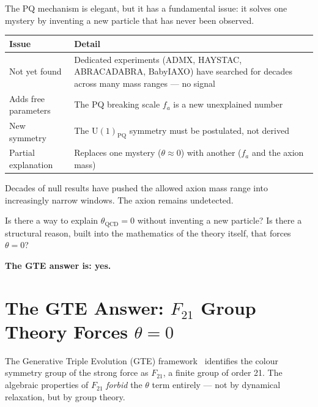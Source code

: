 \documentclass[11pt,a4paper]{article}
\begin{document}
The PQ mechanism is elegant, but it has a fundamental issue: it solves one mystery by inventing a new particle that has never been observed.

\begin{center}
\begin{tabular}{@{}p{3.2cm}p{9cm}@{}}
\toprule
Issue & Detail \\
\midrule
Not yet found & Dedicated experiments (ADMX, HAYSTAC, ABRACADABRA, BabyIAXO)
                have searched for decades across many mass ranges --- no signal \\
Adds free parameters & The PQ breaking scale $f_a$ is a new unexplained number \\
New symmetry & The $\mathrm{U}(1)_{\mathrm{PQ}}$ symmetry must be postulated, not derived \\
Partial explanation & Replaces one mystery ($\theta \approx 0$) with another ($f_a$ and the axion mass) \\
\bottomrule
\end{tabular}
\end{center}

\medskip
Decades of null results have pushed the allowed axion mass range into increasingly narrow windows.  The axion remains undetected.

\begin{tcolorbox}[colback=boxorange,colframe=orange!60!black,title=The key question]
Is there a way to explain $\theta_{\mathrm{QCD}} = 0$ without inventing a new particle?  Is there a structural reason, built into the mathematics of the theory itself, that forces $\theta = 0$?

\bigskip
\textbf{The GTE answer is: yes.}
\end{tcolorbox}

\section{The GTE Answer: $F_{21}$ Group Theory Forces $\theta = 0$}

\begin{tcolorbox}[colback=boxgreen,colframe=green!50!black,title=The GTE result in one sentence]
The Generative Triple Evolution (GTE) framework~\cite{SpivackGTECompleteFramework} identifies the colour symmetry group of the strong force as $F_{21}$, a finite group of order 21.  The algebraic properties of $F_{21}$ \emph{forbid} the $\theta$ term entirely --- not by dynamical relaxation, but by group theory.
\end{tcolorbox}
\end{document}
